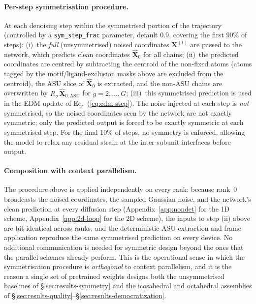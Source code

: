 \documentclass{article}
\theoremstyle{plain}
\theoremstyle{definition}
\theoremstyle{remark}
\begin{document}
\paragraph{Per-step symmetrisation procedure.} At each denoising step within the symmetrised portion of the trajectory (controlled by a \texttt{sym\_step\_frac} parameter, default $0.9$, covering the first $90\%$ of steps): (i)~the \emph{full} (unsymmetrised) noised coordinates $\mathbf{X}^{(t)}$ are passed to the network, which predicts clean coordinates $\hat{\mathbf{X}}_0$ for all chains; (ii)~the predicted coordinates are centred by subtracting the centroid of the non-fixed atoms (atoms tagged by the motif/ligand-exclusion masks above are excluded from the centroid), the ASU slice of $\hat{\mathbf{X}}_0$ is extracted, and the non-ASU chains are overwritten by $R_g\,\hat{\mathbf{X}}_{0,\text{ASU}}$ for $g=2,\dots,G$; (iii)~this symmetrised prediction is used in the EDM update of Eq.~(\ref{eq:edm-step}). The noise injected at each step is \emph{not} symmetrised, so the noised coordinates seen by the network are not exactly symmetric; only the predicted output is forced to be exactly symmetric at each symmetrised step. For the final $10\%$ of steps, no symmetry is enforced, allowing the model to relax any residual strain at the inter-subunit interfaces before output.

\paragraph{Composition with context parallelism.} The procedure above is applied independently on every rank: because rank~$0$ broadcasts the noised coordinates, the sampled Gaussian noise, and the network's clean prediction at every diffusion step (Appendix~\ref{app:nondet} for the 1D scheme, Appendix~\ref{app:2d-loop} for the 2D scheme), the inputs to step (ii) above are bit-identical across ranks, and the deterministic ASU extraction and frame application reproduce the same symmetrised prediction on every device. No additional communication is needed for symmetric design beyond the ones that the parallel schemes already perform. This is the operational sense in which the symmetrisation procedure is \emph{orthogonal} to context parallelism, and it is the reason a single set of pretrained weights designs both the unsymmetrised baselines of \S\ref{sec:results-symmetry} and the icosahedral and octahedral assemblies of \S\ref{sec:results-quality}--\S\ref{sec:results-democratization}.

\end{document}
